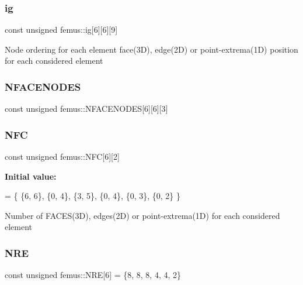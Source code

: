 \mbox{\label{namespacefemus_a6df31099f676311de214a312d7043941}} 
\subsubsection{\texorpdfstring{ig}{ig}}
{\footnotesize\ttfamily const unsigned femus\+::ig\mbox{[}6\mbox{]}\mbox{[}6\mbox{]}\mbox{[}9\mbox{]}}

Node ordering for each element face(3\+D), edge(2\+D) or point-\/extrema(1D) position for each considered element \mbox{\label{namespacefemus_aa64bce2ca72ce98136cf440d9ab68df8}} 
\subsubsection{\texorpdfstring{N\+F\+A\+C\+E\+N\+O\+D\+ES}{NFACENODES}}
{\footnotesize\ttfamily const unsigned femus\+::\+N\+F\+A\+C\+E\+N\+O\+D\+ES\mbox{[}6\mbox{]}\mbox{[}6\mbox{]}\mbox{[}3\mbox{]}}

\mbox{\label{namespacefemus_a6c2ecc75dab06265197007d969b9f100}} 
\subsubsection{\texorpdfstring{N\+FC}{NFC}}
{\footnotesize\ttfamily const unsigned femus\+::\+N\+FC\mbox{[}6\mbox{]}\mbox{[}2\mbox{]}}

{\bfseries Initial value\+:}
\begin{DoxyCode}
= \{
    \{6, 6\},
    \{0, 4\},
    \{3, 5\},
    \{0, 4\},
    \{0, 3\},
    \{0, 2\}
  \}
\end{DoxyCode}
Number of F\+A\+C\+E\+S(3\+D), edges(2\+D) or point-\/extrema(1D) for each considered element \mbox{\label{namespacefemus_a04f7c8d5db5b1c3150b108f3dcb5f022}} 
\subsubsection{\texorpdfstring{N\+RE}{NRE}}
{\footnotesize\ttfamily const unsigned femus\+::\+N\+RE\mbox{[}6\mbox{]} = \{8, 8, 8, 4, 4, 2\}}

